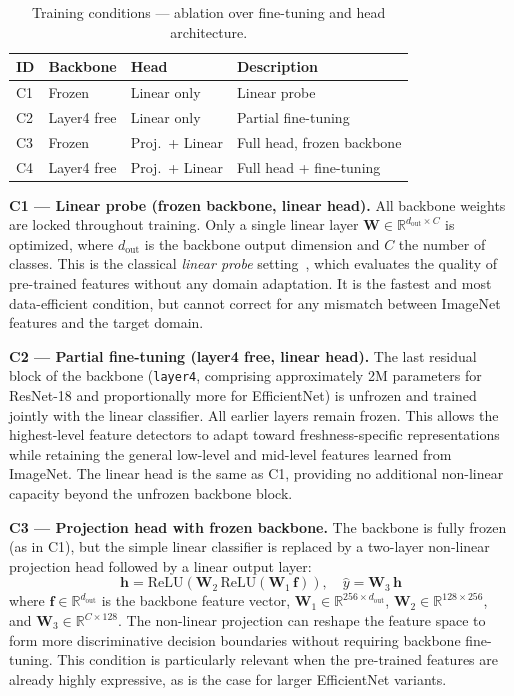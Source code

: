 \documentclass[conference]{IEEEtran}
\begin{document}
\begin{table}[h]
\centering
\caption{Training conditions — ablation over fine-tuning and head architecture.}
\label{tab:conditions}
\begin{tabular}{lp{1.8cm}p{1.8cm}p{2.2cm}}
\toprule
\textbf{ID} & \textbf{Backbone} & \textbf{Head} & \textbf{Description} \\
\midrule
C1 & Frozen      & Linear only         & Linear probe \\
C2 & Layer4 free & Linear only         & Partial fine-tuning \\
C3 & Frozen      & Proj.\ + Linear     & Full head, frozen backbone \\
C4 & Layer4 free & Proj.\ + Linear     & Full head + fine-tuning \\
\bottomrule
\end{tabular}
\end{table}

\textbf{C1 — Linear probe (frozen backbone, linear head).}
All backbone weights are locked throughout training.
Only a single linear layer $\mathbf{W} \in \mathbb{R}^{d_\text{out} \times C}$
is optimized, where $d_\text{out}$ is the backbone output dimension and
$C$ the number of classes.
This is the classical \textit{linear probe} setting~\cite{kornblith2019better},
which evaluates the quality of pre-trained features without any domain
adaptation.
It is the fastest and most data-efficient condition, but cannot correct
for any mismatch between ImageNet features and the target domain.

\textbf{C2 — Partial fine-tuning (layer4 free, linear head).}
The last residual block of the backbone (\texttt{layer4}, comprising
approximately 2M parameters for ResNet-18 and proportionally more for
EfficientNet) is unfrozen and trained jointly with the linear classifier.
All earlier layers remain frozen.
This allows the highest-level feature detectors to adapt toward
freshness-specific representations while retaining the general low-level
and mid-level features learned from ImageNet.
The linear head is the same as C1, providing no additional non-linear
capacity beyond the unfrozen backbone block.

\textbf{C3 — Projection head with frozen backbone.}
The backbone is fully frozen (as in C1), but the simple linear classifier
is replaced by a two-layer non-linear projection head followed by a
linear output layer:
\begin{equation}
    \mathbf{h} = \text{ReLU}\!\left(\mathbf{W}_2\,
        \text{ReLU}\!\left(\mathbf{W}_1\,\mathbf{f}\right)\right),
    \quad \hat{y} = \mathbf{W}_3\,\mathbf{h}
\end{equation}
where $\mathbf{f} \in \mathbb{R}^{d_\text{out}}$ is the backbone feature
vector, $\mathbf{W}_1 \in \mathbb{R}^{256 \times d_\text{out}}$,
$\mathbf{W}_2 \in \mathbb{R}^{128 \times 256}$, and
$\mathbf{W}_3 \in \mathbb{R}^{C \times 128}$.
The non-linear projection can reshape the feature space to form more
discriminative decision boundaries without requiring backbone fine-tuning.
This condition is particularly relevant when the pre-trained features
are already highly expressive, as is the case for larger EfficientNet
variants.
\end{document}
